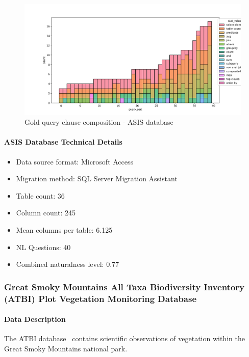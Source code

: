 \begin{figure}[H]
  \centering
  \includegraphics[width=\linewidth]{figures/query-stats/ASIS_20161108_HerpInv_Database-stats-clause-counts.png}
  \caption{Gold query clause composition - ASIS database}
  \label{fig:query-complexity-asis}
\end{figure}

\paragraph{ASIS Database Technical Details}
\begin{itemize}
  \item Data source format: Microsoft Access
  \item Migration method: SQL Server Migration Assistant
  \item Table count: 36
  \item Column count: 245
  \item Mean columns per table: 6.125
  \item NL Questions: 40
  \item Combined naturalness level: 0.77 
\end{itemize}

\subsubsection{Great Smoky Mountains All Taxa Biodiversity Inventory (ATBI) Plot Vegetation Monitoring Database}

\paragraph{Data Description}
The ATBI database~\cite{gsmnp-atbi} contains scientific observations of vegetation within the Great Smoky Mountains national park.

